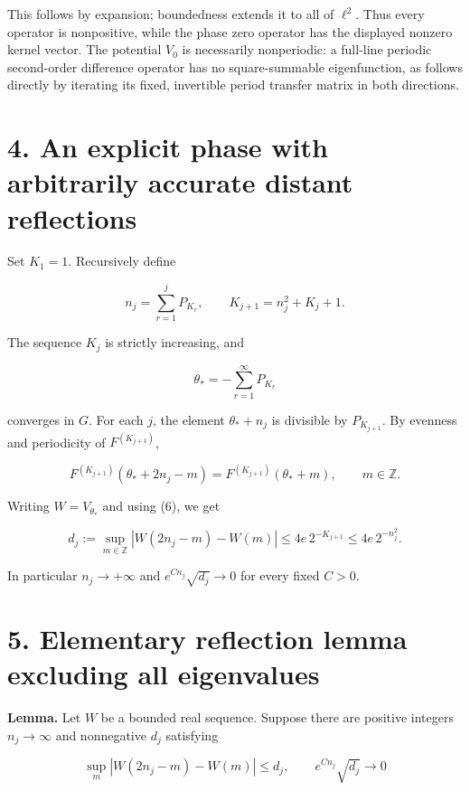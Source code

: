\documentclass[11pt,a4paper]{article}
\begin{document}
This follows by expansion; boundedness extends it to all of \(\ell^2\).
Thus every operator is nonpositive, while the phase zero operator has
the displayed nonzero kernel vector. The potential \(V_0\) is
necessarily nonperiodic: a full-line periodic second-order difference
operator has no square-summable eigenfunction, as follows directly by
iterating its fixed, invertible period transfer matrix in both
directions.

\hypertarget{1018-an-explicit-phase-with-arbitrarily-accurate-distant-reflections}{%
\section{4. An explicit phase with arbitrarily accurate distant
reflections}\label{1018-an-explicit-phase-with-arbitrarily-accurate-distant-reflections}}

Set \(K_1=1\). Recursively define

\[
n_j=\sum_{r=1}^j P_{K_r},\qquad
K_{j+1}=n_j^2+K_j+1.
\tag{15}
\]

The sequence \(K_j\) is strictly increasing, and

\[
\theta_*=-\sum_{r=1}^\infty P_{K_r}
\tag{16}
\]

converges in \(G\). For each \(j\), the element \(\theta_*+n_j\) is
divisible by \(P_{K_{j+1}}\). By evenness and periodicity of
\(F^{(K_{j+1})}\),

\[
F^{(K_{j+1})}(\theta_*+2n_j-m)
=F^{(K_{j+1})}(\theta_*+m),\qquad m\in\mathbb Z.
\]

Writing \(W=V_{\theta_*}\) and using (6), we get

\[
d_j:=\sup_{m\in\mathbb Z}|W(2n_j-m)-W(m)|
\leq4e\,2^{-K_{j+1}}
\leq4e\,2^{-n_j^2}.
\tag{17}
\]

In particular \(n_j\to+\infty\) and \(e^{C n_j}\sqrt{d_j}\to0\) for
every fixed \(C>0\).

\hypertarget{1018-elementary-reflection-lemma-excluding-all-eigenvalues}{%
\section{5. Elementary reflection lemma excluding all
eigenvalues}\label{1018-elementary-reflection-lemma-excluding-all-eigenvalues}}

\textbf{Lemma.} Let \(W\) be a bounded real sequence. Suppose there are
positive integers \(n_j\to\infty\) and nonnegative \(d_j\) satisfying

\[
\sup_m|W(2n_j-m)-W(m)|\leq d_j,
\qquad e^{C n_j}\sqrt{d_j}\longrightarrow0
\]
\end{document}
